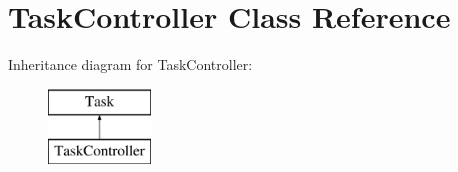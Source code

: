\hypertarget{class_task_controller}{\section{Task\-Controller Class Reference}
\label{class_task_controller}
}
Inheritance diagram for Task\-Controller\-:\begin{figure}[H]
\begin{center}
\leavevmode
\includegraphics[height=2.000000cm]{class_task_controller}
\end{center}
\end{figure}
